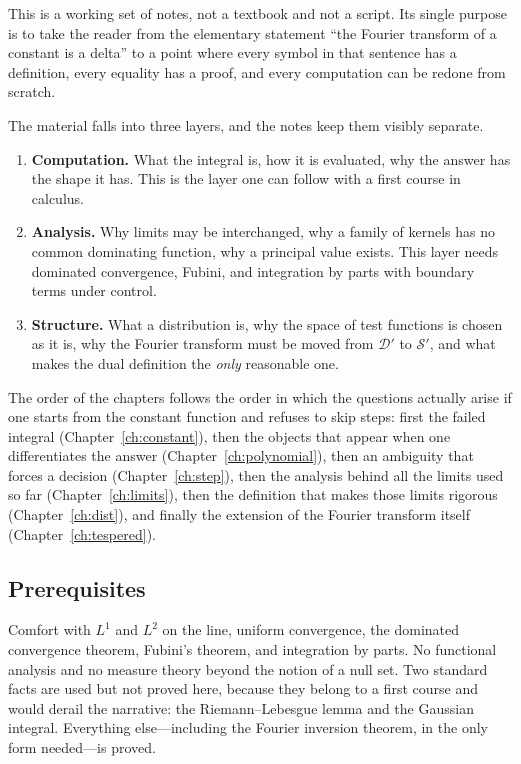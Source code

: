 \documentclass[11pt,openany,oneside]{book}
\theoremstyle{plain}
\theoremstyle{definition}
\theoremstyle{remark}
\numberwithin{equation}{chapter}
\newcommand{\D}{\mathcal{D}}
\newcommand{\Sw}{\mathcal{S}}
\begin{document}
This is a working set of notes, not a textbook and not a script. Its single purpose is to take
the reader from the elementary statement ``the Fourier transform of a constant is a delta'' to a
point where every symbol in that sentence has a definition, every equality has a proof, and every
computation can be redone from scratch.

The material falls into three layers, and the notes keep them visibly separate.

\begin{enumerate}
\item \textbf{Computation.} What the integral is, how it is evaluated, why the answer has the
shape it has. This is the layer one can follow with a first course in calculus.
\item \textbf{Analysis.} Why limits may be interchanged, why a family of kernels has no common
dominating function, why a principal value exists. This layer needs dominated convergence,
Fubini, and integration by parts with boundary terms under control.
\item \textbf{Structure.} What a distribution is, why the space of test functions is chosen as it
is, why the Fourier transform must be moved from $\D'$ to $\Sw'$, and what makes the dual
definition the \emph{only} reasonable one.
\end{enumerate}

The order of the chapters follows the order in which the questions actually arise if one starts
from the constant function and refuses to skip steps: first the failed integral
(Chapter~\ref{ch:constant}), then the objects that appear when one differentiates the answer
(Chapter~\ref{ch:polynomial}), then an ambiguity that forces a decision
(Chapter~\ref{ch:step}), then the analysis behind all the limits used so far
(Chapter~\ref{ch:limits}), then the definition that makes those limits rigorous
(Chapter~\ref{ch:dist}), and finally the extension of the Fourier transform itself
(Chapter~\ref{ch:tespered}).

\subsection*{Prerequisites}

Comfort with $L^{1}$ and $L^{2}$ on the line, uniform convergence, the dominated convergence
theorem, Fubini's theorem, and integration by parts. No functional analysis and no measure theory
beyond the notion of a null set. Two standard facts are used but not proved here, because they
belong to a first course and would derail the narrative: the Riemann--Lebesgue lemma and the
Gaussian integral. Everything else---including the Fourier inversion theorem, in the only form
needed---is proved.
\end{document}
